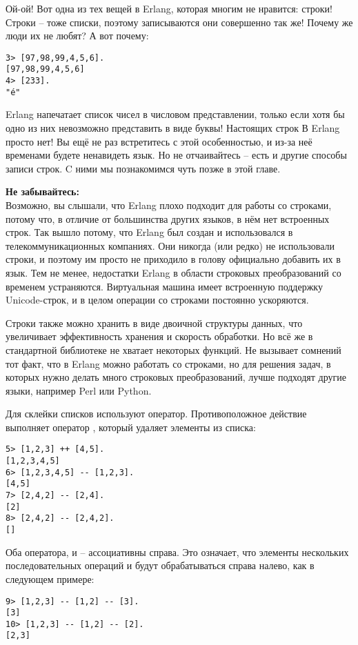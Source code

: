 Ой\--ой!
Вот одна из тех вещей в Erlang, которая многим не нравится: строки!
Строки \--- тоже списки, поэтому записываются они совершенно так же!
Почему же люди их не любят?
А вот почему:
\begin{lstlisting}[style=repl]
3> [97,98,99,4,5,6].
[97,98,99,4,5,6]
4> [233].
"é"
\end{lstlisting}

Erlang напечатает список чисел в числовом представлении, только если хотя бы одно из них невозможно представить в виде буквы!
Настоящих строк В Erlang просто нет!
Вы ещё не раз встретитесь с этой особенностью, и из\--за неё временами будете ненавидеть язык.
Но не отчаивайтесь \--- есть и другие способы записи строк.
C ними мы познакомимся чуть позже в этой главе.\\ 
\colorbox{lorange}
{
    \begin{minipage}{1.0\linewidth}
        \textbf{Не забывайтесь:}\\ 
        Возможно, вы слышали, что Erlang плохо подходит для работы со строками, потому что, в отличие от большинства других языков, в нём нет встроенных строк.
        Так вышло потому, что Erlang был создан и использовался в телекоммуникационных компаниях.
        Они никогда (или редко) не использовали строки, и поэтому им просто не приходило в голову официально добавить их в язык.
        Тем не менее, недостатки Erlang в области строковых преобразований со временем устраняются.
        Виртуальная машина имеет встроенную поддержку Unicode\--строк, и в целом операции со строками постоянно ускоряются.
        
        Строки также можно хранить в виде двоичной структуры данных, что увеличивает эффективность хранения и скорость обработки.
        Но всё же в стандартной библиотеке не хватает некоторых функций.
        Не вызывает сомнений тот факт, что в Erlang можно работать со строками, но для решения задач, в которых нужно делать много строковых преобразований, лучше подходят другие языки, например Perl или Python.
    \end{minipage}
}

Для склейки списков используют оператор\ops{++}.
Противоположное действие выполняет оператор \ops{$--$}, который удаляет элементы из списка:
\begin{lstlisting}[style=repl]
5> [1,2,3] ++ [4,5].
[1,2,3,4,5]
6> [1,2,3,4,5] -- [1,2,3].
[4,5]
7> [2,4,2] -- [2,4].
[2]
8> [2,4,2] -- [2,4,2].
[]
\end{lstlisting}

Оба оператора, \ops{++} и \ops{$--$} \--- ассоциативны справа.
Это означает, что элементы нескольких последовательных операций \ops{++} и \ops{$--$} будут обрабатываться справа налево, как в следующем примере:
\begin{lstlisting}[style=repl]
9> [1,2,3] -- [1,2] -- [3].
[3]
10> [1,2,3] -- [1,2] -- [2].
[2,3]
\end{lstlisting}

